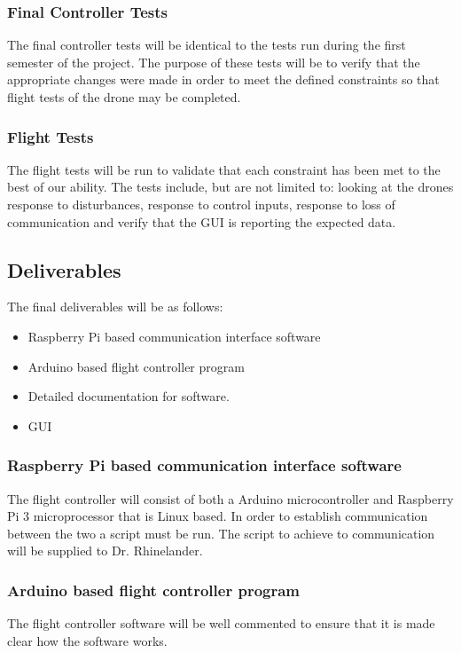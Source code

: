 \subsubsection{Final Controller Tests}
The final controller tests will be identical to the tests run during the first semester of the project. The purpose of these tests will be to verify that the appropriate changes were made in order to meet the defined constraints so that flight tests of the drone may be completed. 

\subsubsection{Flight Tests}
The flight tests will be run to validate that each constraint has been met to the best of our ability. The tests include, but are not limited to: looking at the drones response to disturbances, response to control inputs, response to loss of communication and verify that the GUI is reporting the expected data. 

\subsection{Deliverables}
The final deliverables will be as follows: 
\begin{itemize}
	
\item Raspberry Pi based communication interface software
\item Arduino based flight controller program
\item Detailed documentation for software.
\item GUI

\end{itemize}
\subsubsection{Raspberry Pi based communication interface software}
The flight controller will consist of both a Arduino microcontroller and Raspberry Pi 3 microprocessor that is Linux based. In order to establish communication between the two a script must be run. The script to achieve to communication will be supplied to Dr. Rhinelander. 
\subsubsection{Arduino based flight controller program}
The flight controller software will be well commented to ensure that it is made clear how the software works. 
